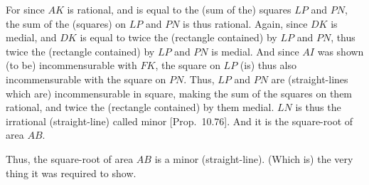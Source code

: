 \begin{Parallel}{}{}
{For since $AK$ is rational, and is equal to the (sum of the) squares $LP$ and $PN$,
the sum of the (squares) on $LP$ and $PN$ is thus rational. Again, since
$DK$ is medial, and $DK$ is equal to twice the (rectangle contained)
by $LP$ and $PN$, thus twice the (rectangle contained) by $LP$
and $PN$ is medial. And since $AI$ was shown (to be) incommensurable
with $FK$, the square on $LP$ (is) thus also incommensurable with
the square on $PN$. Thus, $LP$ and $PN$ are (straight-lines which are) incommensurable in square,
making the sum of the squares on them rational, and twice the (rectangle
contained) by them medial. $LN$ is thus the irrational (straight-line)
called minor [Prop.~10.76]. And it is
the square-root of area $AB$.

Thus, the square-root of area $AB$ is a minor (straight-line). (Which is)
the very thing it was required to show.}
\end{Parallel}

